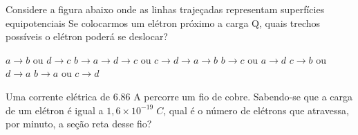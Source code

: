 \documentclass[12pt, addpoints]{exam}
\begin{document}
    \begin{questions}
\begin{multicols*}{2}
\question Considere a figura abaixo onde as linhas trajeçadas representam superfícies equipotenciais Se colocarmos um elétron próximo a carga Q, quais trechos possíveis o elétron poderá se deslocar?
        
        \begin{center}
            \begin{minipage}[c]{0.5\linewidth}
            \end{minipage}
        \end{center}
        
        

\begin{choices}
\choice $a\rightarrow b$ ou $d\rightarrow c$ 
\choice $b\rightarrow a\rightarrow d\rightarrow c$ ou $c\rightarrow d\rightarrow a\rightarrow b$ 
\choice $b\rightarrow c$ ou $a\rightarrow d$ 
\choice $c\rightarrow b$ ou $d\rightarrow a$ 
\choice $b\rightarrow a$ ou $c\rightarrow d$ 
\end{choices}
\question Uma corrente elétrica de    6.86 A percorre um ﬁo de cobre. Sabendo-se que a carga de um elétron é igual a $1,6\times 10^{-19}\;C$, qual é o número de elétrons que atravessa, por minuto, a seção reta desse ﬁo?


\end{multicols*}
\end{questions}
\end{document}
